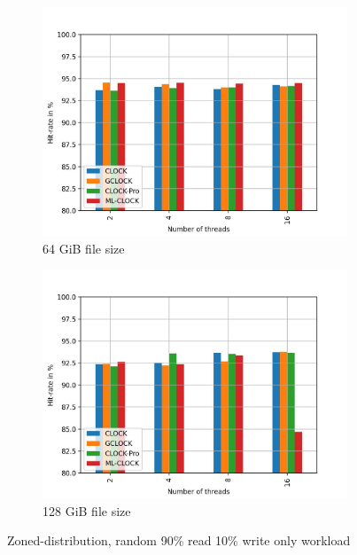 \documentclass[
	12pt,
	a4paper,
	abstract,
	bibliography=totoc,
	chapterprefix,
	headings=openright,
	numbers=endperiod,
	parskip=half,
	twoside,
]{scrreprt}
\begin{document}
\begin{figure}[H]
\begin{subfigure}{0.4\textwidth}
		\includegraphics[width=\textwidth]{multi_64_gb_rw_90to10_zoned.jpg}		
		\caption{64 GiB file size}
		\label{fig:rw_90to10 64 zoned}
	\end{subfigure}
	\hfill
	\begin{subfigure}{0.4\textwidth}
		\includegraphics[width=\textwidth]{multi_128_gb_rw_90to10_zoned.jpg}		
		\caption{128 GiB file size}
		\label{fig:rw_90to10 128 zoned}
	\end{subfigure}
	\caption{Zoned-distribution, random 90\% read 10\% write only workload}
	\label{fig:multi zoned rw_90to10}
\end{figure}
\end{document}
